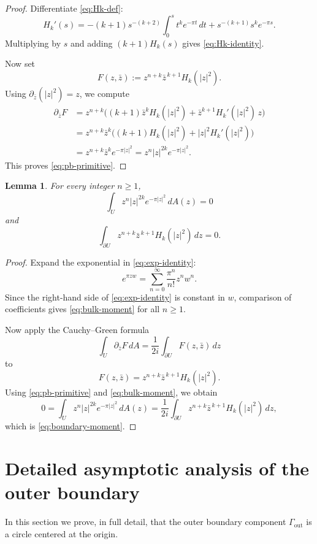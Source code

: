 \documentclass[11pt]{amsart}
\newtheorem{lemma}[theorem]{Lemma}
\theoremstyle{remark}
\newcommand{\1}{\mathbf 1}
\newcommand{\pb}{\partial_{\bar z}}
\begin{document}
\begin{proof}
Differentiate \eqref{eq:Hk-def}:
\[
H_k'(s)
=
-(k+1)s^{-(k+2)}\int_0^s t^k e^{-\pi t}\,dt
+s^{-(k+1)}s^k e^{-\pi s}.
\]
Multiplying by $s$ and adding $(k+1)H_k(s)$ gives \eqref{eq:Hk-identity}.

Now set
\[
F(z,\bar z):=z^{n+k}\bar z^{\,k+1}H_k(|z|^2).
\]
Using $\pb(|z|^2)=z$, we compute
\begin{align*}
\pb F
&=
z^{n+k}\Big((k+1)\bar z^k H_k(|z|^2)+\bar z^{k+1}H_k'(|z|^2)\,z\Big) \\
&=
z^{n+k}\bar z^k\Big((k+1)H_k(|z|^2)+|z|^2H_k'(|z|^2)\Big) \\
&=
z^{n+k}\bar z^k e^{-\pi|z|^2}
=
z^n |z|^{2k}e^{-\pi|z|^2}.
\end{align*}
This proves \eqref{eq:pb-primitive}.
\end{proof}

\begin{lemma}\label{lem:boundary-moments}
For every integer $n\ge 1$,
\begin{equation}\label{eq:bulk-moment}
\int_U z^n |z|^{2k}e^{-\pi|z|^2}\,dA(z)=0
\end{equation}
and
\begin{equation}\label{eq:boundary-moment}
\int_{\partial U} z^{n+k}\bar z^{\,k+1}H_k(|z|^2)\,dz = 0.
\end{equation}
\end{lemma}

\begin{proof}
Expand the exponential in \eqref{eq:exp-identity}:
\[
e^{\pi zw}=\sum_{n=0}^\infty \frac{\pi^n}{n!} z^n w^n.
\]
Since the right-hand side of \eqref{eq:exp-identity} is constant in $w$, comparison of coefficients gives \eqref{eq:bulk-moment} for all $n\ge 1$.

Now apply the Cauchy--Green formula
\[
\int_U \pb F\, dA=\frac{1}{2i}\int_{\partial U} F(z,\bar z)\,dz
\]
to
\[
F(z,\bar z)=z^{n+k}\bar z^{\,k+1}H_k(|z|^2).
\]
Using \eqref{eq:pb-primitive} and \eqref{eq:bulk-moment}, we obtain
\[
0
=
\int_U z^n |z|^{2k}e^{-\pi|z|^2}\,dA(z)
=
\frac{1}{2i}\int_{\partial U} z^{n+k}\bar z^{\,k+1}H_k(|z|^2)\,dz,
\]
which is \eqref{eq:boundary-moment}.
\end{proof}

\section{Detailed asymptotic analysis of the outer boundary}

In this section we prove, in full detail, that the outer boundary component
$\Gamma_{\mathrm{out}}$ is a circle centered at the origin.
\end{document}
